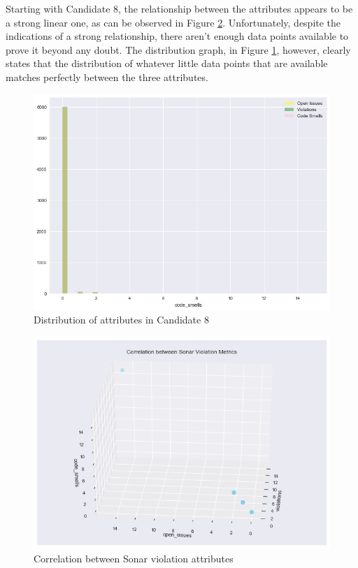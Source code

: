 \begin{enumerate}
Starting with Candidate 8, the relationship between the attributes appears to be a strong linear one, as can be observed in Figure \ref{fig:3d:candidate8-relationship}. Unfortunately, despite the indications of a strong relationship, there aren't enough data points available to prove it beyond any doubt. The distribution graph, in Figure \ref{fig:candidate8-distribution}, however, clearly states that the distribution of whatever little data points that are available matches perfectly between the three attributes.

\begin{figure}
    \centering
    \includegraphics[scale=0.6]{Figures/correlation/Attribute_Distribution_in_Candidate_8.png}
    \caption{Distribution of attributes in Candidate 8}
    \label{fig:candidate8-distribution}
\end{figure}

\begin{figure}[!h]
    \centering
    \includegraphics[scale=0.6]{Figures/three-d/Correlation_between_attributes_violations_open_issues_code_smells.png}
    \caption{Correlation between Sonar violation attributes}
    \label{fig:3d:candidate8-relationship}
\end{figure}


\end{enumerate}
